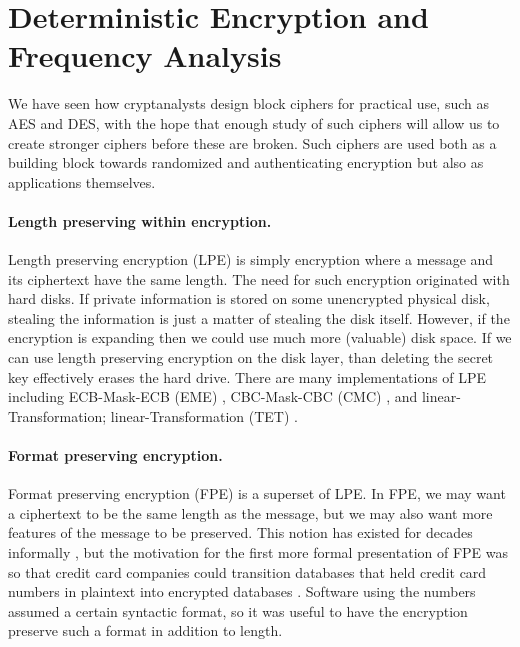 \section{Deterministic Encryption and Frequency Analysis}
\label{sec:freqanalysis}

We have seen how cryptanalysts design block ciphers for practical use, such as AES and DES, with the hope that enough study of such ciphers will allow us to create stronger ciphers before these are broken.
 Such ciphers are used both as a building block towards randomized and authenticating encryption but also as applications themselves.

\paragraph{Length preserving within encryption.} 
Length preserving encryption (LPE) is simply encryption where a message and its ciphertext have the same length. The need for such encryption originated with hard disks. If private information is stored on some unencrypted physical disk, stealing the information is just a matter of stealing the disk itself. However, if the encryption is expanding then we could use much more (valuable) disk space. If we can use length preserving encryption on the disk layer, than deleting the secret key effectively erases the hard drive. There are many implementations of LPE including ECB-Mask-ECB (EME) \cite{Halevi2004EME}, CBC-Mask-CBC (CMC) \cite{Halevi2003CMC}, and linear-Transformation; linear-Transformation (TET) \cite{Halevi2007TET}.

\paragraph{Format preserving encryption.}
Format preserving encryption (FPE) is a superset of LPE. In FPE, we may want a ciphertext to be the same length as the message, but we may also want more features of the message to be preserved. This notion has existed for decades informally \cite{commerce1981FPE} \cite{Brightwell1997FPE}, but the motivation for the first more formal presentation of FPE was so that credit card companies could transition databases that held credit card numbers in plaintext into encrypted databases \cite{Rogaway2002FPE}. Software using the numbers assumed a certain syntactic format, so it was useful to have the encryption preserve such a format in addition to length.


